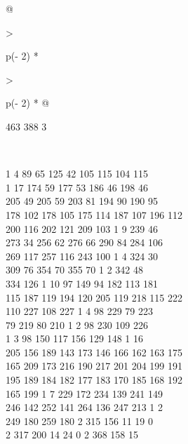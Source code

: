 \begin{question}
\begin{longtable}[]{@{}

  >{\raggedright\arraybackslash}p{(\columnwidth - 2\tabcolsep) * }

  >{\raggedright\arraybackslash}p{(\columnwidth - 2\tabcolsep) * }@{}}
\begin{minipage}[t]{\linewidth}
463 388 3\strut

\end{minipage} \\

\begin{minipage}[t]{\linewidth}\raggedright

1 4 89 65 125 42 105 115 104 115\\

1 17 174 59 177 53 186 46 198 46\\

205 49 205 59 203 81 194 90 190 95\\

178 102 178 105 175 114 187 107 196 112\\

200 116 202 121 209 103 1 9 239 46\\

273 34 256 62 276 66 290 84 284 106\\

269 117 257 116 243 100 1 4 324 30\\

309 76 354 70 355 70 1 2 342 48\\

334 126 1 10 97 149 94 182 113 181\\

115 187 119 194 120 205 119 218 115 222\\

110 227 108 227 1 4 98 229 79 223\\

79 219 80 210 1 2 98 230 109 226\\

1 3 98 150 117 156 129 148 1 16\\

205 156 189 143 173 146 166 162 163 175\\

165 209 173 216 190 217 201 204 199 191\\

195 189 184 182 177 183 170 185 168 192\\

165 199 1 7 229 172 234 139 241 149\\

246 142 252 141 264 136 247 213 1 2\\

249 180 259 180 2 315 156 11 19 0\\

2 317 200 14 24 0 2 368 158 15\\


\end{minipage}
\end{longtable}
\end{question}
